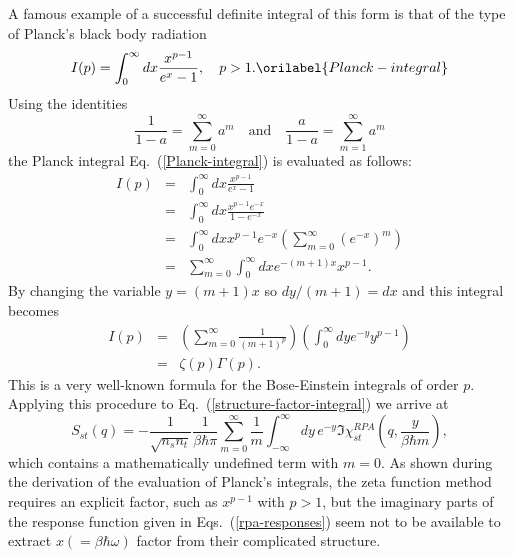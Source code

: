\documentclass[aps,showkeys,noshowpacs,superscriptaddress,pre,preprint]{revtex4-2}
\let\label\orilabel
\begin{document}
A famous example of a successful definite integral of this form is 
that of the type of Planck's black body radiation~\cite{Landau5}
\begin{equation}
{I ( p )} = \int_{0}^{\infty} dx \frac{x^{p-1}}{e^x - 1} , \quad p > 1 .
\label{Planck-integral}
\end{equation}
Using the identities
\begin{equation*}
\frac{1}{1 - a} = \sum_{m = 0}^{\infty}a^m \quad \textrm{and} \quad
\frac{a}{1 - a} = \sum_{m = 1}^{\infty} a^m
\end{equation*}
the Planck integral Eq.~(\ref{Planck-integral}) is evaluated as follows:
\begin{eqnarray*}
{I ( p )} &=& \int_{0}^{\infty} dx \frac{x^{p-1}}{e^x - 1} \\ 
&=& \int_{0}^{\infty} dx \frac{x^{p-1} e^{-x}}{1 - e^{-x}} \\
&=& \int_{0}^{\infty} dx x^{p-1} e^{-x} \left( \sum_{m = 0}^{\infty} \left( e^{-x} \right)^m \right) \\
&=& \sum_{m = 0}^{\infty} \int_{0}^{\infty} dx e^{- \left( m + 1 \right) x} x^{p-1} .
\end{eqnarray*}
By changing the variable $y= (m+1) x$ so $dy/(m+1) = dx$ and this integral becomes
\begin{eqnarray*}
{I ( p )} &= & 
\left( \sum_{m = 0}^{\infty} \frac{1}{\left( m + 1 \right)^p} \right) 
\left( \int_{0}^{\infty} dy   e^{-y} y^{p - 1} \right) \\
&=& \zeta \left( p \right) \Gamma \left( p \right) .
\end{eqnarray*}
This is a very well-known formula for the Bose-Einstein integrals of order $p$.
Applying this procedure to Eq.~(\ref{structure-factor-integral}) we arrive at
\begin{equation*}
{S_{st} ( q )} = - \frac{1}{\sqrt{ n_s n_t }} \frac{1}{\beta \hbar \pi} \sum_{m=0}^{\infty} \frac{1}{m}
\int_{-\infty}^{\infty} dy \, e^{-y} 
{\Im \chi^{RPA}_{st}  \left( q, \frac{y}{\beta \hbar m} \right) } ,
\end{equation*}
which contains a mathematically undefined term with $m=0$.
As shown during the derivation of the evaluation of Planck's integrals,
the zeta function method requires an explicit factor, such as $x^{p-1}$ with $p > 1$,
but the imaginary parts of the response function given in Eqs.~(\ref{rpa-responses})
seem not to be available to extract $x \left( = \beta \hbar \omega \right)$ factor
from their complicated structure.
\end{document}
